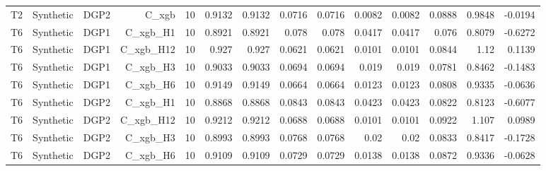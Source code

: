 \begin{table}[htbp]
\begin{tabular}{lrrrrrrrrrrrrr}
    T2 & Synthetic & DGP2 & C\_xgb & 10 & 0.9132 & 0.9132 & 0.0716 & 0.0716 & 0.0082 & 0.0082 & 0.0888 & 0.9848 & -0.0194 \\
    T6 & Synthetic & DGP1 & C\_xgb\_H1 & 10 & 0.8921 & 0.8921 & 0.078 & 0.078 & 0.0417 & 0.0417 & 0.076 & 0.8079 & -0.6272 \\
    T6 & Synthetic & DGP1 & C\_xgb\_H12 & 10 & 0.927 & 0.927 & 0.0621 & 0.0621 & 0.0101 & 0.0101 & 0.0844 & 1.12 & 0.1139 \\
    T6 & Synthetic & DGP1 & C\_xgb\_H3 & 10 & 0.9033 & 0.9033 & 0.0694 & 0.0694 & 0.019 & 0.019 & 0.0781 & 0.8462 & -0.1483 \\
    T6 & Synthetic & DGP1 & C\_xgb\_H6 & 10 & 0.9149 & 0.9149 & 0.0664 & 0.0664 & 0.0123 & 0.0123 & 0.0808 & 0.9335 & -0.0636 \\
    T6 & Synthetic & DGP2 & C\_xgb\_H1 & 10 & 0.8868 & 0.8868 & 0.0843 & 0.0843 & 0.0423 & 0.0423 & 0.0822 & 0.8123 & -0.6077 \\
    T6 & Synthetic & DGP2 & C\_xgb\_H12 & 10 & 0.9212 & 0.9212 & 0.0688 & 0.0688 & 0.0101 & 0.0101 & 0.0922 & 1.107 & 0.0989 \\
    T6 & Synthetic & DGP2 & C\_xgb\_H3 & 10 & 0.8993 & 0.8993 & 0.0768 & 0.0768 & 0.02 & 0.02 & 0.0833 & 0.8417 & -0.1728 \\
    T6 & Synthetic & DGP2 & C\_xgb\_H6 & 10 & 0.9109 & 0.9109 & 0.0729 & 0.0729 & 0.0138 & 0.0138 & 0.0872 & 0.9336 & -0.0628 \\
    \bottomrule
  \end{tabular}
\end{table}
